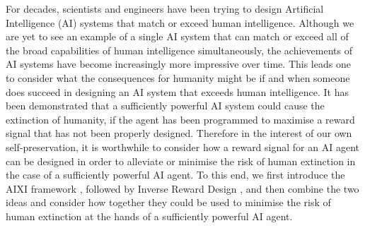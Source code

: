 For decades, scientists and engineers have been trying to design Artificial Intelligence (AI) systems that match or exceed human intelligence. Although we are yet to see an example of a single AI system that can match or exceed all of the broad capabilities of human intelligence simultaneously, the achievements of AI systems have become increasingly more impressive over time. This leads one to consider what the consequences for humanity might be if and when someone does succeed in designing an AI system that exceeds human intelligence. It has been demonstrated \cite{cohen2022advanced} that a sufficiently powerful AI system could cause the extinction of humanity, if the agent has been programmed to maximise a reward signal that has not been properly designed. Therefore in the interest of our own self-preservation, it is worthwhile to consider how a reward signal for an AI agent can be designed in order to alleviate or minimise the risk of human extinction in the case of a sufficiently powerful AI agent. To this end, we first introduce the AIXI framework \cite{hutter2000theory}, followed by Inverse Reward Design \cite{hadfield2017inverse}, and then combine the two ideas and consider how together they could be used to minimise the risk of human extinction at the hands of a sufficiently powerful AI agent.
